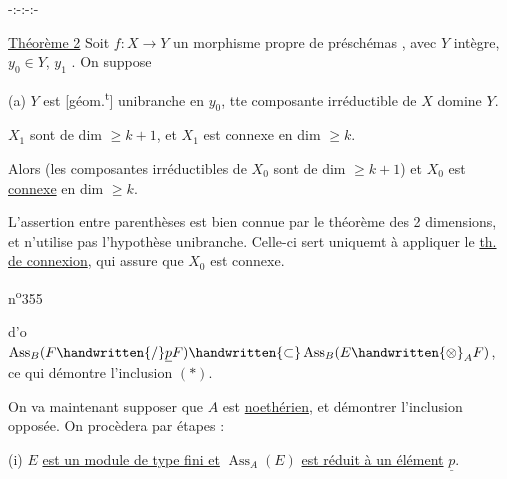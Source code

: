 \begin{center}-:-:-:-\end{center}


\uline{Théorème 2} Soit $f:X\longrightarrow Y$ un morphisme  propre de préschémas  , avec $Y$ intègre, $y_0\in Y$, $y_1$  . On suppose   %

 (a) $Y$ est [géom.\textsuperscript{t}] unibranche en $y_0$,  tte composante irréductible de $X$ domine $Y$.

   $X_1$ sont de dim $\geq k+1$, et $X_1$ est connexe en dim $\geq k$.

Alors (les composantes irréductibles de $X_0$ sont de dim $\geq k+1$) et $X_0$ est \uline{connexe} en dim $\geq k$.

L'assertion entre parenthèses est bien connue par le théorème des 2 dimensions, et n'utilise pas l'hypothèse unibranche. Celle-ci sert uniquemt à appliquer le \uline{th. de connexion}, qui assure que $X_0$ est connexe.

\noindent\hfill n\textsuperscript{o}355

d'o $\operatorname{Ass}_B(F\handwritten{/}\underline p F)\handwritten{\subset}\operatorname{Ass}_B(E\handwritten{\otimes}_A F)$, ce qui démontre l'inclusion $(\ast)$.

On va maintenant supposer que $A$ est \uline{noethérien}, et démontrer l'inclusion opposée. On procèdera par étapes :

(i) $E$ \uline{est un module de type fini et} $\operatorname{Ass}_A(E)$ \uline{est réduit à un élément} $\underline p$.

